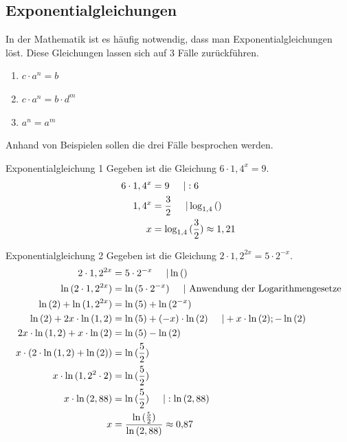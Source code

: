 \subsection{Exponentialgleichungen}
In der Mathematik ist es häufig notwendig, dass man Exponentialgleichungen löst. Diese Gleichungen lassen sich auf 3 Fälle zurückführen. 
\begin{enumerate}
    \item $c\cdot a^n = b $ 
    \item $c\cdot a^n = b\cdot d^m$
    \item $a^n=a^m$
\end{enumerate}
Anhand von Beispielen sollen die drei Fälle besprochen werden.
\begin{bsp}{Exponentialgleichung 1}{}
Gegeben ist die Gleichung $6\cdot 1,4^x = 9$.
\begin{equation*}
    \begin{split}
        6\cdot 1,4^x &= 9 \hspace{0.5cm} | : 6\\
        1,4^x&= \dfrac{3}{2} \hspace{0.5cm} | \log_{1,4}{()}\\
        x&= \log_{1,4}{(\frac{3}{2})} \approx 1,21
    \end{split}
\end{equation*}
\end{bsp}
\begin{bsp}{Exponentialgleichung 2}{}
Gegeben ist die Gleichung $2\cdot 1,2^{2x} = 5\cdot 2^{-x}$.
\begin{equation*}
    \begin{split}
        2\cdot 1,2^{2x} &= 5\cdot 2^{-x} \hspace{0.5cm} | \ln{()}\\
        \ln{(2\cdot 1,2^{2x})} &= \ln{(5\cdot 2^{-x})} \hspace{0.5cm}| \text{ Anwendung der Logarithmengesetze}\\
        \ln{(2)} + \ln{(1,2^{2x})} &= \ln{(5)} + \ln{(2^{-x})}\\
        \ln{(2)} + 2x\cdot \ln{(1,2)} &= \ln{(5)} +(-x) \cdot \ln{(2)} \hspace{0.5cm} | + x \cdot \ln{(2)}; -\ln{(2)}\\
          2x\cdot \ln{(1,2)} + x \cdot \ln{(2)} &= \ln{(5)} -\ln{(2)}\\
          x\cdot \left(2\cdot \ln{(1,2)} + \ln{(2)} \right) &= \ln{(\frac{5}{2})}\\
          x\cdot \ln{(1,2^2 \cdot 2)}&= \ln{(\frac{5}{2})}\\
           x\cdot \ln{(2,88)}&= \ln{(\frac{5}{2})}\hspace{0.5cm}| :\ln{(2,88)}\\
           x&= \dfrac{\ln{(\frac{5}{2})}}{\ln{(2,88)}} \approx 0{,}87
    \end{split}
\end{equation*}
\end{bsp}

